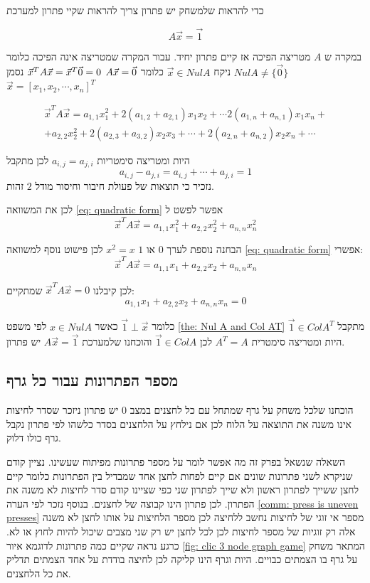 \documentclass[12pt,twoside]{article}
\begin{document}
כדי להראות שלמשחק יש פתרון 
צריך להראות שקיי פתרון למערכת

\[A \vec{x} = \vec{1} \]

במקרה ש 
$A$
מטריצה הפיכה אז קיים פתרון יחיד.
עבור המקרה שמטריצה אינה הפיכה 
כלומר 
$Nul A \neq \{ \vec{0}\}$
ניקח 
$\vec{x} \in Nul A$
כלומר 
$A\vec{x} = \vec{0} \\$
$\vec{x}^T A \vec{x} = \vec{x}^T\vec{0} = 0 \\$
נסמן 
$\vec{x} = [x_1, x_2, \cdots, x_n]^T$

\begin{multline}
    \label{eq: quadratic form}
        \vec{x}^T A \vec{x} = a_{1,1}x_1^2 + 2(a_{1,2} + a_{2,1})x_1x_2 + \cdots 2(a_{1,n} + a_{n,1})x_1x_n + \\
        + a_{2,2}x_2^2 +  2(a_{2,3} + a_{3,2})x_2x_3 + \cdots  + 2(a_{2,n} + a_{n,2})x_2x_n + \cdots
\end{multline}

היות ומטריצה סימטריות
$a_{i,j} = a_{j,i}$
לכן
מתקבל
\[a_{i,j} - a_{j,i} = a_{i,j} + \cdots + a_{j,i} = 1 \]
נזכיר כי תוצאות של פעולת חיבור וחיסור מודל 
$2$
זהות.

לכן
את המשוואה 
\ref{eq: quadratic form}
אפשר לפשט ל
\[ \vec{x}^T A \vec{x} = a_{1,1}x_1^2 + a_{2,2} x_2^2 +  a_{n,n} x_n^2\]

הבחנה נוספת לערך 
$0$
או
$1$
$x^2 = x$
לכן פישוט נוסף למשוואה 
\ref{eq: quadratic form}
אפשרי:
\[ \vec{x}^T A \vec{x} = a_{1,1}x_1 + a_{2,2} x_2 +  a_{n,n} x_n\]

לכן קיבלנו 
$ \vec{x}^T A \vec{x} = 0$
שמתקיים:
\[a_{1,1}x_1 + a_{2,2} x_2 +  a_{n,n} x_n = 0\]

כלומר 
$\vec{1} \perp  \vec{x}$
כאשר 
$x \in Nul A$
לפי משפט 
\ref{the: Nul A and Col AT}
מתקבל 
$\vec{1} \in Col A^T$
היות ומטריצה סימטרית 
$A^T = A$
לכן
$\vec{1} \in Col A$
והוכחנו שלמערכת
$A\vec{x} = \vec{1}$
יש פתרון.

\subsection{מספר הפתרונות עבור כל גרף}
הוכחנו שלכל משחק על גרף שמתחל עם כל לחצנים במצב 
$0$
יש פתרון ניזכר שסדר לחיצות
אינו משנה את התוצאה על הלוח לכן אם נילחץ על הלחצנים בסדר כלשהו 
לפי פתרון נקבל גרף כולו דלוק.

השאלה  שנשאל בפרק זה מה אפשר לומר על מספר פתרונות מפיתוח שעשינו.
נציין קודם שניקרא לשני פתרונות שונים אם קיים לפחות לחצן אחד שמבדיל בין הפתרונות 
כלומר קיים לחצן ששייך לפתרון ראשון ולא שייך לפתרון שני כפי שציינו קודם סדר
לחיצות לא משנה את הפתרון.
לכן פתרון הינו קבוצה של לחצנים.
בנוסף נזכר לפי הערה
\ref{comm: press is uneven presses}
מספר אי זוגי של לחיצות נחשב ללחיצה לכן מספר הלחיצות על אותו לחצן לא משנה 
אלה רק זוגיות של מספר לחיצות 
לכן לכל לחצן יש רק שני מצבים שיכול להיות 
לחוץ 
או לא.
כרגע נראה שקיים כמה פתרונות לדוגמא 
איור
\ref{fig: clic 3 node graph game}
המתאר משחק על גרף בו הצמתים כבויים.
היות וגרף הינו קליקה לכן לחיצה בודדת על אחד הצמתים תדליק את כל הלחצנים.
\end{document}

